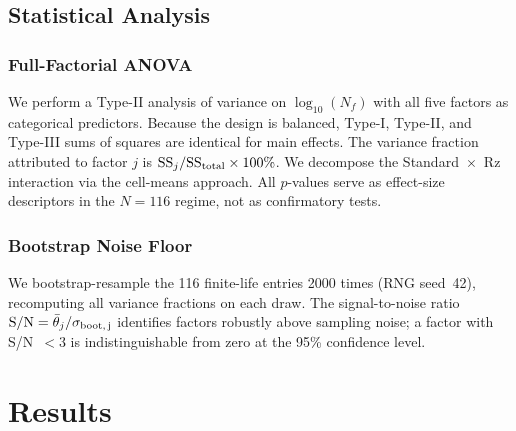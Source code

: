 \documentclass[12pt,a4paper]{article}
\begin{document}
\subsection{Statistical Analysis}

\subsubsection{Full-Factorial ANOVA}

We perform a Type-II analysis of variance on $\log_{10}(N_f)$ with all
five factors as categorical predictors. Because the design is balanced,
Type-I, Type-II, and Type-III sums of squares are identical for main
effects. The variance fraction attributed to factor $j$ is
$\mathrm{SS}_j / \mathrm{SS}_{\rm total} \times 100\%$. We decompose
the Standard~$\times$~Rz interaction via the cell-means approach.
All $p$-values serve as effect-size descriptors in the $N=116$ regime,
not as confirmatory tests.

\subsubsection{Bootstrap Noise Floor}

We bootstrap-resample the 116 finite-life entries 2000 times (RNG
seed~42), recomputing all variance fractions on each draw. The
signal-to-noise ratio $\mathrm{S/N} = \bar{\theta}_j /
\sigma_{\rm boot,\,j}$ identifies factors robustly above sampling noise;
a factor with S/N~$<3$ is indistinguishable from zero at the 95\%
confidence level.

\section{Results}
\label{sec:results}
\end{document}
